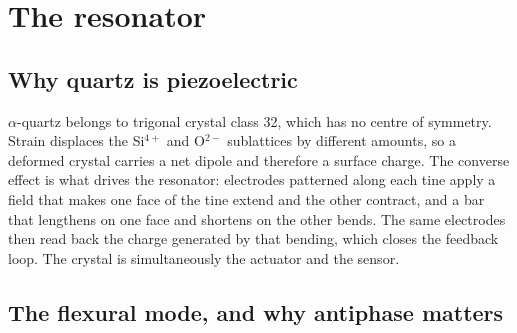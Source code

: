 \documentclass[11pt,a4paper]{article}
\begin{document}
\section{The resonator}

\subsection{Why quartz is piezoelectric}

$\alpha$-quartz belongs to trigonal crystal class 32, which has no centre of symmetry. Strain
displaces the Si$^{4+}$ and O$^{2-}$ sublattices by different amounts, so a deformed crystal
carries a net dipole and therefore a surface charge. The converse effect is what drives the
resonator: electrodes patterned along each tine apply a field that makes one face of the tine
extend and the other contract, and a bar that lengthens on one face and shortens on the other
bends. The same electrodes then read back the charge generated by that bending, which closes
the feedback loop. The crystal is simultaneously the actuator and the sensor.

\subsection{The flexural mode, and why antiphase matters}
\end{document}
